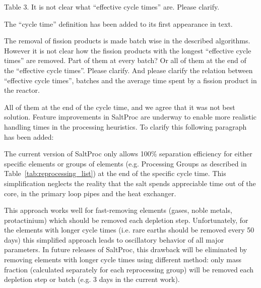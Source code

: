\documentclass[answers,11pt]{exam}
\begin{document}
\begin{questions}
\begin{solution}
                
        \end{solution}


        \question Table 3. It is not clear what ``effective cycle times'' are. 
        Please clarify.
        \begin{solution}
                The ``cycle time'' definition has been added to its first appearance in text.
        \end{solution}


        \question The removal of fission products is made batch wise in the 
        described algorithms. However it is not clear how the fission products 
        with the longest ``effective cycle times'' are removed. Part of them at 
        every batch? Or all of them at the end of the  ``effective cycle 
        times''.  Please clarify. And please clarify the relation between 
        ``effective cycle times'', batches and the average time spent by a 
        fission product in the reactor.
        \begin{solution}
                All of them at the end of the cycle time, and we agree that it
                 was not best solution. Feature improvements in SaltProc are 
                 underway to enable more realistic handling times in the 
                 processing heuristics. To clarify this following paragraph has 
                been added:
                
                The current version of SaltProc only allows 100\% separation 
                efficiency for either specific elements or groups of elements 
                (e.g. Processing Groups as described in 
				Table~\ref{tab:reprocessing_list}) at the end of the specific 
				cycle time. This simplification neglects the reality that 
				the salt spends appreciable time out of the core, in the 
				primary loop pipes and the heat exchanger.  

				This approach works well for fast-removing elements (gases, 
				noble metals, protactinium) which should be removed each 
				depletion step. Unfortunately, for the elements with longer 
				cycle times (i.e. rare earths should be removed every 50 days) 
				this simplified approach leads to oscillatory behavior of all
				major parameters. In future releases of SaltProc, this drawback 
				will be eliminated by removing elements with longer cycle times 
				using different method: only mass fraction (calculated separately 
				for each reprocessing group) will be removed each depletion step 
				or batch (e.g. 3 days in the current work).
        \end{solution}


\end{questions}
\end{document}
